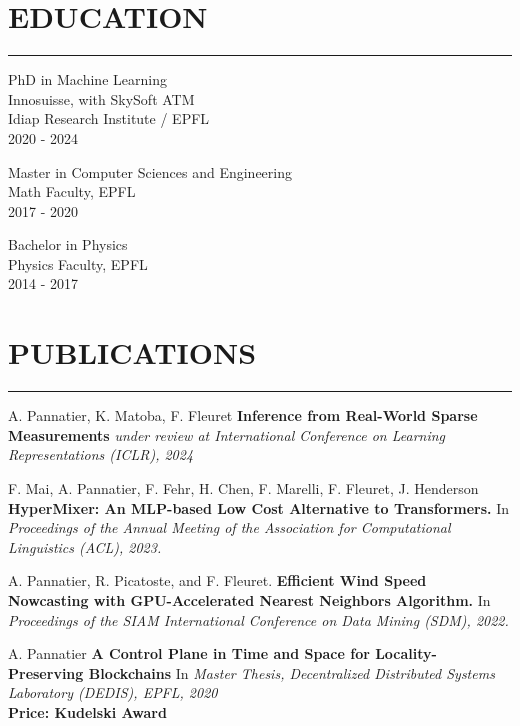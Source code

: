 \documentclass{article}
\let\oldhrule\hrule
\renewcommand{\hrule}{\color{lightgray}\oldhrule\color{black}}
\newcommand{\rubric}[1]{
    \color{mediumgray}

    \section*{\montserratlight \large \MakeUppercase{#1}} 
    \hrule
    \vspace{4mm}
    \raggedright
}
\begin{document}
\begin{minipage}[t]{0.3\textwidth}
  \rubric{Education}

  \color{deepgray}
  \large PhD in Machine Learning \\
  \color{mediumgray} \small
  Innosuisse, with SkySoft ATM \\
  Idiap Research Institute / EPFL \\
  2020 - 2024

  \vspace{4mm}
  \color{deepgray}
  \large Master in Computer Sciences and Engineering \\
  \color{mediumgray} \small
  Math Faculty, EPFL \\
  2017 - 2020

  \vspace{4mm}
  \color{deepgray}
  \large Bachelor in Physics \\
  \color{mediumgray} \small
  Physics Faculty, EPFL \\
  2014 - 2017

\end{minipage}\hfill
\begin{minipage}[t]{0.65\textwidth}
  \rubric{Publications}
  \small
  A. Pannatier, K. Matoba, F. Fleuret \textbf{Inference from Real-World Sparse Measurements} \textit{under review at International Conference on Learning Representations (ICLR), 2024}
  \vspace{4mm}

  F. Mai, A. Pannatier, F. Fehr, H. Chen, F. Marelli, F. Fleuret, J. Henderson \textbf{HyperMixer: An MLP-based Low Cost Alternative to Transformers.} In \textit{Proceedings of the Annual Meeting of the Association for Computational Linguistics (ACL), 2023.}
  \vspace{4mm}

  A. Pannatier, R. Picatoste, and F. Fleuret. \textbf{Efficient Wind Speed Nowcasting with GPU-Accelerated Nearest Neighbors Algorithm.} In \textit{Proceedings of the SIAM International Conference on Data Mining (SDM), 2022.}
  \vspace{4mm}

  A. Pannatier \textbf{A Control Plane in Time and Space for Locality-Preserving Blockchains} In \textit{Master Thesis, Decentralized Distributed Systems Laboratory (DEDIS), EPFL, 2020} \\
  \textbf{Price: Kudelski Award}
  \vspace{4mm}
\end{minipage}
\end{document}
